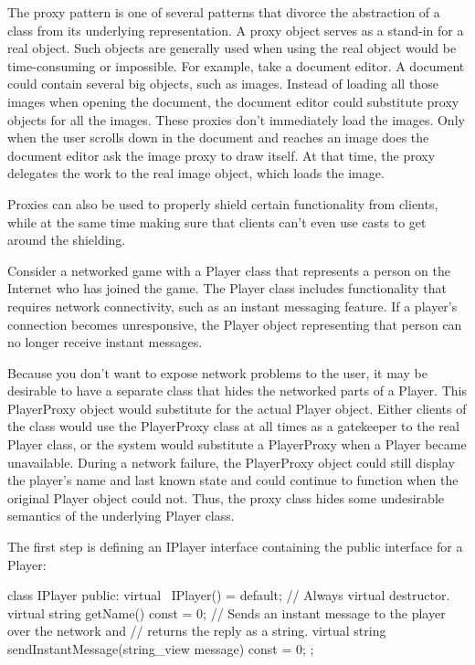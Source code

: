 
The proxy pattern is one of several patterns that divorce the abstraction of a class from its underlying representation. A proxy object serves as a stand-in for a real object. Such objects are generally used when using the real object would be time-consuming or impossible. For example, take a document editor. A document could contain several big objects, such as images. Instead of loading all those images when opening the document, the document editor could substitute proxy objects for all the images. These proxies don’t immediately load the images. Only when the user scrolls down in the document and reaches an image does the document editor ask the image proxy to draw itself. At that time, the proxy delegates the work to the real image object, which loads the image.

Proxies can also be used to properly shield certain functionality from clients, while at the same time making sure that clients can’t even use casts to get around the shielding.


Consider a networked game with a Player class that represents a person on the Internet who has joined the game. The Player class includes functionality that requires network connectivity, such as an instant messaging feature. If a player’s connection becomes unresponsive, the Player object representing that person can no longer receive instant messages.

Because you don’t want to expose network problems to the user, it may be desirable to have a separate class that hides the networked parts of a Player. This PlayerProxy object would substitute for the actual Player object. Either clients of the class would use the PlayerProxy class at all times as a gatekeeper to the real Player class, or the system would substitute a PlayerProxy when a Player became unavailable. During a network failure, the PlayerProxy object could still display the player’s name and last known state and could continue to function when the original Player object could not. Thus, the proxy class hides some undesirable semantics of the underlying Player class.


The first step is defining an IPlayer interface containing the public interface for a Player:

\begin{cpp}
class IPlayer
{
    public:
        virtual ~IPlayer() = default; // Always virtual destructor.
        virtual string getName() const = 0;
        // Sends an instant message to the player over the network and
        // returns the reply as a string.
        virtual string sendInstantMessage(string_view message) const = 0;
};
\end{cpp}

